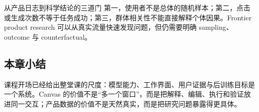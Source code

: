 \begin{warningbox}{从产品日志到科学结论的三道门}
第一，使用者不是总体的随机样本；第二，点击或生成次数不等于任务成功；第三，群体相关性不能直接解释个体因果。Frontier product research 可以从真实流量快速发现问题，但仍需要明确 sampling、outcome 与 counterfactual。
\end{warningbox}

\subsection{本章小结}

课程开场已经给出整堂课的尺度：模型能力、工作界面、用户证据与后训练目标是一个系统。Canvas 的价值不是“多一个窗口”，而是把解释、编辑、执行和验证放进同一交互；产品数据的价值不是天然真实，而是把研究问题暴露得更具体。

